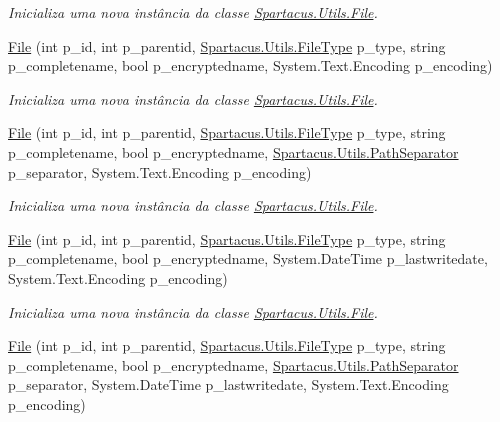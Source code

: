 \begin{DoxyCompactItemize}
\begin{DoxyCompactList}\small\item\em Inicializa uma nova instância da classe \hyperlink{classSpartacus_1_1Utils_1_1File}{Spartacus.\+Utils.\+File}. \end{DoxyCompactList}\item 
\hyperlink{classSpartacus_1_1Utils_1_1File_a51af32b9823da6fc33256e7ee820ea86}{File} (int p\+\_\+id, int p\+\_\+parentid, \hyperlink{namespaceSpartacus_1_1Utils_a2bc44488e88db523cb2dcffaa6e77541}{Spartacus.\+Utils.\+File\+Type} p\+\_\+type, string p\+\_\+completename, bool p\+\_\+encryptedname, System.\+Text.\+Encoding p\+\_\+encoding)
\begin{DoxyCompactList}\small\item\em Inicializa uma nova instância da classe \hyperlink{classSpartacus_1_1Utils_1_1File}{Spartacus.\+Utils.\+File}. \end{DoxyCompactList}\item 
\hyperlink{classSpartacus_1_1Utils_1_1File_a559e21a3db47947c63e2bdf3c59d96eb}{File} (int p\+\_\+id, int p\+\_\+parentid, \hyperlink{namespaceSpartacus_1_1Utils_a2bc44488e88db523cb2dcffaa6e77541}{Spartacus.\+Utils.\+File\+Type} p\+\_\+type, string p\+\_\+completename, bool p\+\_\+encryptedname, \hyperlink{namespaceSpartacus_1_1Utils_a9ee24558a33d60b42674bae3eed2a094}{Spartacus.\+Utils.\+Path\+Separator} p\+\_\+separator, System.\+Text.\+Encoding p\+\_\+encoding)
\begin{DoxyCompactList}\small\item\em Inicializa uma nova instância da classe \hyperlink{classSpartacus_1_1Utils_1_1File}{Spartacus.\+Utils.\+File}. \end{DoxyCompactList}\item 
\hyperlink{classSpartacus_1_1Utils_1_1File_a8b2f6fe8fb5582530e769926cd24515f}{File} (int p\+\_\+id, int p\+\_\+parentid, \hyperlink{namespaceSpartacus_1_1Utils_a2bc44488e88db523cb2dcffaa6e77541}{Spartacus.\+Utils.\+File\+Type} p\+\_\+type, string p\+\_\+completename, bool p\+\_\+encryptedname, System.\+Date\+Time p\+\_\+lastwritedate, System.\+Text.\+Encoding p\+\_\+encoding)
\begin{DoxyCompactList}\small\item\em Inicializa uma nova instância da classe \hyperlink{classSpartacus_1_1Utils_1_1File}{Spartacus.\+Utils.\+File}. \end{DoxyCompactList}\item 
\hyperlink{classSpartacus_1_1Utils_1_1File_a30f9e29f29158ac6dd8d80ea331c8885}{File} (int p\+\_\+id, int p\+\_\+parentid, \hyperlink{namespaceSpartacus_1_1Utils_a2bc44488e88db523cb2dcffaa6e77541}{Spartacus.\+Utils.\+File\+Type} p\+\_\+type, string p\+\_\+completename, bool p\+\_\+encryptedname, \hyperlink{namespaceSpartacus_1_1Utils_a9ee24558a33d60b42674bae3eed2a094}{Spartacus.\+Utils.\+Path\+Separator} p\+\_\+separator, System.\+Date\+Time p\+\_\+lastwritedate, System.\+Text.\+Encoding p\+\_\+encoding)

\end{DoxyCompactItemize}
